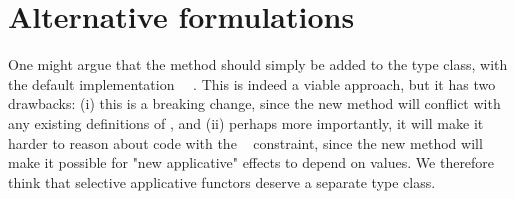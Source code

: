 \section{Alternative formulations}\label{sec-alternatives}

One might argue that the  method should simply be added to the
 type class, with the default implementation
~\hs{=}~. This is indeed a viable approach, but it has
two drawbacks: (i) this is a breaking change, since the new method will conflict
with any existing definitions of , and (ii) perhaps more importantly,
it will make it harder to reason about code with the ~
constraint, since the new method will make it possible for "new applicative"
effects to depend on values. We therefore think that selective applicative
functors deserve a separate type class.

